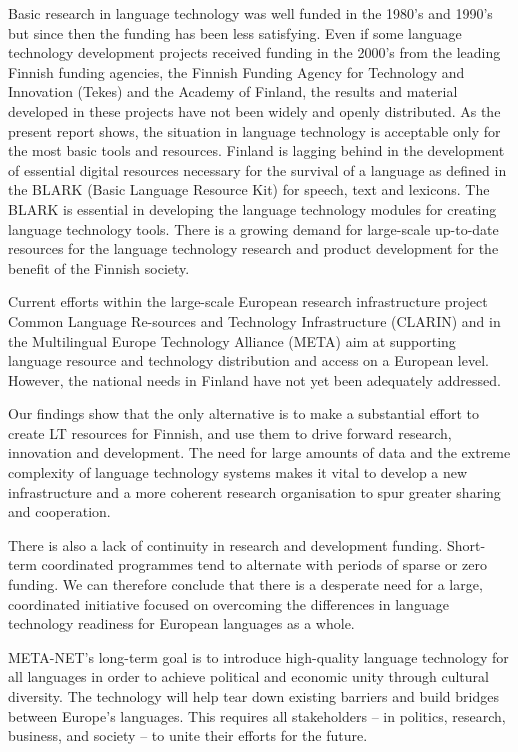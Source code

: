 \begin{multicols}{2}
Basic research in language technology was well funded in the 1980's and 1990's but since then the funding has been less satisfying. Even if some language technology development projects received funding in the 2000's from the leading Finnish funding agencies, the Finnish Funding Agency for Technology and Innovation (Tekes) and the Academy of Finland, the results and material developed in these projects have not been widely and openly distributed. As the present report shows, the situation in language technology is acceptable only for the most basic tools and resources. Finland is lagging behind in the development of essential digital resources necessary for the survival of a language as defined in the BLARK (Basic Language Resource Kit) for speech, text and lexicons. The BLARK is essential in developing the language technology modules for creating language technology tools. There is a growing demand for large-scale up-to-date resources for the language technology research and product development for the benefit of the Finnish society.

Current efforts within the large-scale European research infrastructure project Common Language Re-sources and Technology Infrastructure (CLARIN) and in the Multilingual Europe Technology Alliance (META) aim at supporting language resource and technology distribution and access on a European level. However, the national needs in Finland have not yet been adequately addressed.

Our findings show that the only alternative is to make a substantial effort to create LT resources for Finnish, and use them to drive forward research, innovation and development. The need for large amounts of data and the extreme complexity of language technology systems makes it vital to develop a new infrastructure and a more coherent research organisation to spur greater sharing and cooperation.

There is also a lack of continuity in research and development funding.  Short-term coordinated programmes tend to alternate with periods of sparse or zero funding. We can therefore conclude that there is a desperate need for a large, coordinated initiative focused on overcoming the differences in language technology readiness for European languages as a whole.

META-NET’s long-term goal is to introduce high-quality language technology for all languages in order to achieve political and economic unity through cultural diversity. The technology will help tear down existing barriers and build bridges between Europe’s languages. This requires all stakeholders -- in politics, research, business, and society -- to unite their efforts for the future.

\end{multicols}


